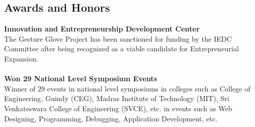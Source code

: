 \documentclass{resume}
\begin{document}
\begin{multicols*}{2}
\section*{Awards and Honors}
\textbf{Innovation and Entrepreneurship Development Center} \\
The Gesture Glove Project has been sanctioned for funding by the IEDC Committee after being recognized as a viable candidate for Entrepreneurial Expansion. \\
\\
\textbf{Won 29 National Level Symposium Events} \\
Winner of 29 events in national level symposiums in colleges such as College of Engineering, Guindy (CEG), Madras Institute of Technology (MIT), Sri Venkateswara College of Engineering (SVCE), etc. in events such as Web Designing, Programming, Debugging, Application Development, etc. \\
\\
\end{multicols*}
\end{document}
